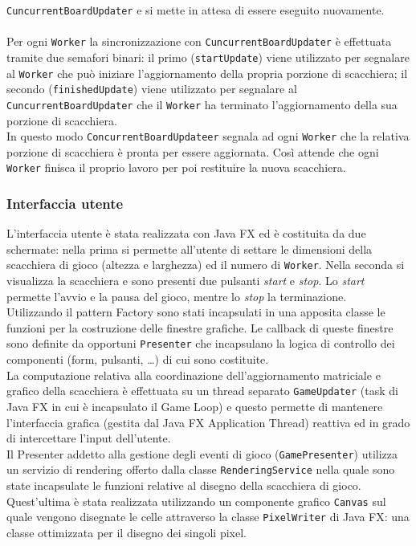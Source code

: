 \documentclass[a4paper]{article}
\begin{document}
\texttt{CuncurrentBoardUpdater} e si mette in attesa di essere eseguito
nuovamente.\\\\
Per ogni \texttt{Worker} la sincronizzazione con
\texttt{CuncurrentBoardUpdater} è effettuata tramite due semafori
binari: il primo (\texttt{startUpdate}) viene utilizzato per segnalare al \texttt{Worker} che può iniziare l'aggiornamento della propria
porzione di scacchiera; il secondo (\texttt{finishedUpdate}) viene
utilizzato per segnalare al \texttt{CuncurrentBoardUpdater} che il
\texttt{Worker} ha terminato l'aggiornamento della sua porzione di
scacchiera.\\
In questo modo \texttt{ConcurrentBoardUpdateer} segnala ad ogni
\texttt{Worker} che la relativa porzione di scacchiera è pronta per
essere aggiornata. Così attende che ogni \texttt{Worker} finisca il
proprio lavoro per poi restituire la nuova scacchiera.

\subsubsection{Interfaccia utente}\label{interfaccia-utente}

L’interfaccia utente è stata realizzata con Java FX ed è costituita da due schermate: nella prima si permette all’utente di settare le dimensioni della scacchiera di gioco (altezza e larghezza) ed il numero di \texttt{Worker}. Nella seconda si visualizza la scacchiera e sono presenti due pulsanti \emph{start} e \emph{stop}. Lo \emph{start} permette l’avvio e la pausa del gioco, mentre lo \emph{stop} la terminazione.\\
Utilizzando il pattern Factory sono stati incapsulati in una apposita classe le funzioni per la costruzione delle finestre grafiche. Le callback di queste finestre sono definite da opportuni \texttt{Presenter} che incapsulano la logica di controllo dei componenti (form, pulsanti, …) di cui sono costituite.\\
La computazione relativa alla coordinazione dell’aggiornamento matriciale e grafico della scacchiera è effettuata su un thread separato \texttt{GameUpdater} (task di Java FX in cui è incapsulato il Game Loop) e questo permette di mantenere l’interfaccia grafica (gestita dal Java FX Application Thread) reattiva ed in grado di intercettare l’input dell’utente.\\
Il Presenter addetto alla gestione degli eventi di gioco (\texttt{GamePresenter}) utilizza un servizio di rendering offerto dalla  classe \texttt{RenderingService} nella quale sono state incapsulate le funzioni relative al disegno della scacchiera di gioco.
Quest'ultima è stata realizzata utilizzando un componente grafico \texttt{Canvas} sul quale vengono disegnate le celle attraverso la classe \texttt{PixelWriter} di Java FX: una classe ottimizzata per il disegno dei singoli pixel.
\end{document}
